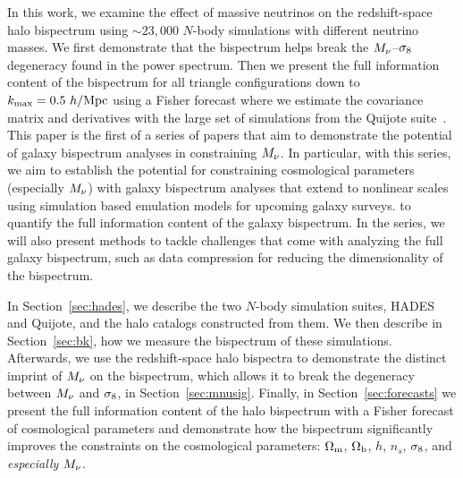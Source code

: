 In this work, we examine the effect of massive neutrinos on the redshift-space 
halo bispectrum using ${\sim}23,000$ $N$-body simulations with different neutrino masses. 
We first demonstrate that the bispectrum helps break the $M_\nu$--$\sigma_8$ degeneracy 
found in the power spectrum. Then we present the full information content of the 
bispectrum for all triangle configurations down to $k_{\rm max} = 0.5~h/{\rm Mpc}$ using 
a Fisher forecast where we estimate the covariance matrix and derivatives with 
the large set of simulations from the Quijote suite~\citep{villaescusa-navarro2019}. 
This paper is the first of a series of papers that aim to demonstrate the potential 
of galaxy bispectrum analyses in constraining $M_\nu$. In particular, with this 
series, we aim to establish the potential for constraining cosmological parameters 
(especially $M_\nu$) with galaxy bispectrum analyses that extend to nonlinear scales 
using simulation based emulation models for upcoming galaxy surveys. 
to quantify the full information content of the galaxy bispectrum. In the series, we 
will also present methods to tackle challenges that come with analyzing the full galaxy 
bispectrum, such as data compression for reducing the dimensionality of the bispectrum. 

In Section~\ref{sec:hades}, we describe the two $N$-body simulation suites, HADES and Quijote, 
and the halo catalogs constructed from them. We then describe in Section~\ref{sec:bk}, 
how we measure the bispectrum of these simulations. 
Afterwards, we use the redshift-space halo bispectra to demonstrate the distinct imprint of 
$M_\nu$ on the bispectrum, which allows it to break the degeneracy between 
$M_\nu$ and $\sigma_8$, in Section~\ref{sec:mnusig}. Finally, in Section~\ref{sec:forecasts} 
we present the full information content of the halo bispectrum with a Fisher forecast 
of cosmological parameters and demonstrate how the bispectrum significantly improves 
the constraints on the cosmological parameters: $\Omega_{\rm m}$, $\Omega_{\rm b}$, $h$, $n_s$, $\sigma_8$, and {\em especially} $M_\nu$. 
